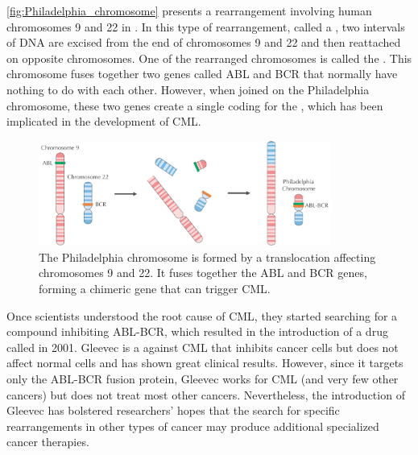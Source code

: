\autoref{fig:Philadelphia_chromosome} presents a rearrangement involving human chromosomes 9 and 22 in .  In this type of rearrangement, called a , two intervals of DNA are excised from the end of chromosomes 9 and 22 and then reattached on opposite chromosomes.  One of the rearranged chromosomes is called the . This chromosome fuses together two genes called ABL and BCR that normally have nothing to do with each other.  However, when joined on the Philadelphia chromosome, these two genes create a single  coding for the , which has been implicated in the development of CML.\\

\begin{figure}[h]
\mySfFamily
\centering
\includegraphics[width = 0.856\textwidth]{images/rearrangements/philadelphia_chromosome}
\caption{The Philadelphia chromosome is formed by a translocation affecting chromosomes 9 and 22.  It fuses together the ABL and BCR genes, forming a chimeric gene that can trigger CML.}
\label{fig:Philadelphia_chromosome}
\end{figure}

\vspace{-0.5\baselineskip}

Once scientists understood the root cause of CML, they started searching for a compound inhibiting ABL-BCR, which resulted in the introduction of a drug called  in 2001. Gleevec is a  against CML that inhibits cancer cells but does not affect normal cells and has shown great clinical results. However, since it targets only the ABL-BCR fusion protein, Gleevec works for CML (and very few other cancers) but does not treat most other cancers. Nevertheless, the introduction of Gleevec has bolstered researchers' hopes that the search for specific rearrangements in other types of cancer may produce additional specialized cancer therapies.\\

